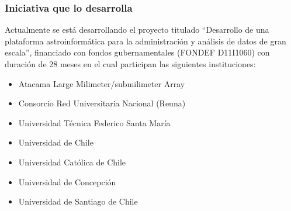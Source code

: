 \begin{frame}
\frametitle{Iniciativa que lo desarrolla}

Actualmente se está desarrollando el proyecto titulado ``Desarrollo de una
plataforma astroinformática para la administración y análisis de datos de gran
escala'', financiado con fondos gubernamentales (FONDEF D11I1060) con duración
de 28 meses en el cual participan las siguientes instituciones:
\begin{itemize}
    \item Atacama Large Milimeter/submilimeter Array
    \item Consorcio Red Universitaria Nacional (Reuna)
    \item Universidad Técnica Federico Santa María
    \item Universidad de Chile
    \item Universidad Católica de Chile
    \item Universidad de Concepción
    \item Universidad de Santiago de Chile
\end{itemize}

\end{frame}
